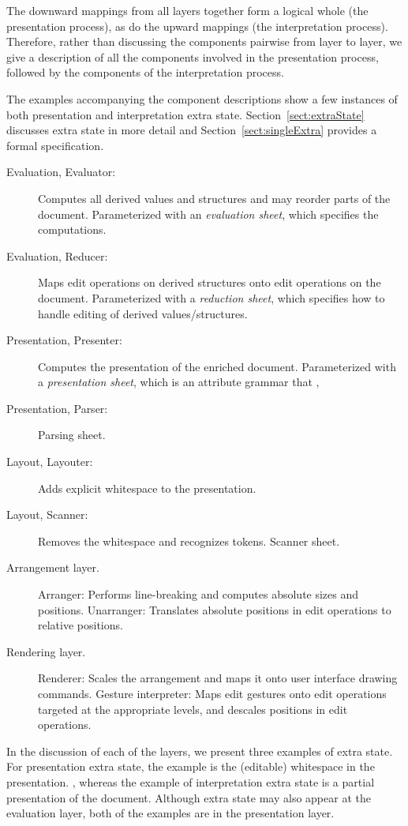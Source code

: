 \documentclass{speauth}
\begin{document}
The downward mappings from all layers together form a logical whole (the presentation process), as do the upward mappings (the interpretation process). Therefore, rather than discussing the components pairwise from layer to layer, we give a description of all the components involved in the presentation process, followed by the components of the interpretation process. 

The examples accompanying the component descriptions show a few instances of both presentation and interpretation extra state. Section~\ref{sect:extraState} discusses extra state in more detail and Section~\ref{sect:singleExtra} provides a formal specification. 

\bc
\begin{description}
\item [Evaluation, Evaluator:] Computes all derived values and structures and may reorder parts of the document. Parameterized with an {\em evaluation sheet}, which specifies the computations.
\item [Evaluation, Reducer:] Maps edit operations on derived structures onto edit operations on the document. Parameterized with a {\em reduction sheet}, which specifies how to handle editing of derived values/structures.
\item [Presentation, Presenter:] Computes the presentation of the enriched document. Parameterized with a {\em presentation sheet}, which is an attribute grammar that , 
\item [Presentation, Parser:] Parsing sheet.
\item [Layout, Layouter:] Adds explicit whitespace to the presentation.
\item [Layout, Scanner:] Removes the whitespace and recognizes tokens. Scanner sheet.
\item [Arrangement layer.]
Arranger: Performs line-breaking and computes absolute sizes and positions.
Unarranger: Translates absolute positions in edit operations to relative positions.
\item [Rendering layer.]
Renderer: Scales the arrangement and maps it onto user interface drawing commands.
Gesture interpreter: Maps edit gestures onto edit operations targeted at the appropriate levels, and descales positions in edit operations.
\end{description}
\ec


\bc
In the discussion of each of the layers, we present three examples of extra state. For presentation extra state, the example is the (editable) whitespace in the presentation. , whereas the example of interpretation extra state is a partial presentation of the document. Although extra state may also appear at the evaluation layer, both of the examples are in the presentation layer. 
\ec
\end{document}
